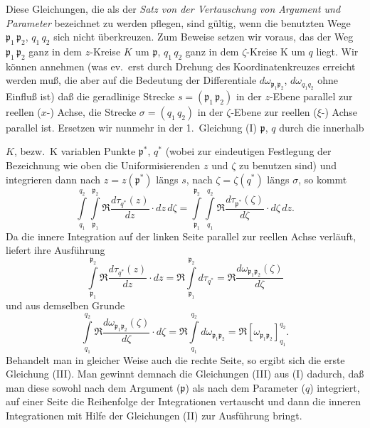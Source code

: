 \documentclass{article}
\begin{document}
Diese Gleichungen, die als der \emph{Satz von der Vertauschung von Argument und Parameter} bezeichnet zu werden pflegen, sind gültig, wenn die benutzten Wege $\mathfrak{p}_1\,\mathfrak{p}_2$, $q_1\,q_2$ sich nicht überkreuzen. Zum Beweise setzen wir voraus, das der Weg $\mathfrak{p}_1\,\mathfrak{p}_2$ ganz in dem $z$-Kreise $K$ um $\mathfrak{p}$, $q_1\,q_2$ ganz in dem $\zeta$-Kreise $\mathrm{K}$ um $q$ liegt. Wir können annehmen (was ev.\ erst durch Drehung des Koordinatenkreuzes erreicht werden muß, die aber auf die Bedeutung der Differentiale $d\omega_{\mathfrak{p}_1 \mathfrak{p}_2}$, $d\omega_{q_1 q_2}$ ohne Einfluß ist) daß die geradlinige Strecke $s = (\mathfrak{p}_1\,\mathfrak{p}_2)$ in der $z$-Ebene parallel zur reellen ($x$-) Achse, die Strecke $\sigma = (q_1\,q_2)$ in der $\zeta$-Ebene zur reellen ($\xi$-) Achse parallel ist. Ersetzen wir nunmehr in der 1.\ Gleichung (I) $\mathfrak{p}$, $q$ durch die innerhalb

$K$, bezw.\ $\mathrm{K}$ variablen Punkte $\mathfrak{p}^*$, $q^*$ (wobei zur eindeutigen Festlegung der Bezeichnung wie oben die Uniformisierenden $z$ und $\zeta$ zu benutzen sind) und integrieren dann nach $z = z(\mathfrak{p}^*)$ längs $s$, nach $\zeta = \zeta(q^*)$ längs $\sigma$, so kommt
\[ \int\limits_{q_1}^{q_2} \int\limits_{\mathfrak{p}_1}^{\mathfrak{p}_2} \Re \frac{d\tau_{q^*}(z)}{dz} \cdot dz\,d\zeta = \int\limits_{\mathfrak{p}_1}^{\mathfrak{p}_2} \int\limits_{q_1}^{q_2} \Re \frac{d\tau_{\mathfrak{p}^*}(\zeta)}{d\zeta} \cdot d\zeta\,dz. \]
Da die innere Integration auf der linken Seite parallel zur reellen Achse verläuft, liefert ihre Ausführung
\[ \int\limits_{\mathfrak{p}_1}^{\mathfrak{p}_2} \Re \frac{d\tau_{q^*}(z)}{dz} \cdot dz = \Re \int\limits_{\mathfrak{p}_1}^{\mathfrak{p}_2} d\tau_{q^*} = \Re \frac{d\omega_{\mathfrak{p}_1 \mathfrak{p}_2}(\zeta)}{d\zeta} \]
und aus demselben Grunde
\[ \int\limits_{q_1}^{q_2} \Re \frac{d\omega_{\mathfrak{p}_1 \mathfrak{p}_2}(\zeta)}{d\zeta} \cdot d\zeta = \Re \int\limits_{q_1}^{q_2} d\omega_{\mathfrak{p}_1 \mathfrak{p}_2} = \Re [\omega_{\mathfrak{p}_1 \mathfrak{p}_2}]_{q_1}^{q_2}. \]
Behandelt man in gleicher Weise auch die rechte Seite, so ergibt sich die erste Gleichung (III). Man gewinnt demnach die Gleichungen (III) aus (I) dadurch, daß man diese sowohl nach dem Argument ($\mathfrak{p}$) als nach dem Parameter ($q$) integriert, auf einer Seite die Reihenfolge der Integrationen vertauscht und dann die inneren Integrationen mit Hilfe der Gleichungen (II) zur Ausführung bringt.
\end{document}
